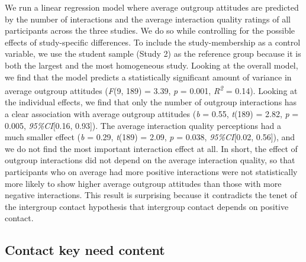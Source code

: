 We run a linear regression model where average outgroup attitudes are
predicted by the number of interactions and the average interaction
quality ratings of all participants across the three studies. We do so
while controlling for the possible effects of study-specific
differences. To include the study-membership as a control variable, we
use the student sample (Study 2) as the reference group because it is
both the largest and the most homogeneous study. Looking at the overall
model, we find that the model predicts a statistically significant
amount of variance in average outgroup attitudes (\textit{F}(9, 189) =
3.39, \textit{p} = 0.001, \textit{R\textsuperscript{2}} = 0.14). Looking
at the individual effects, we find that only the number of outgroup
interactions has a clear association with average outgroup attitudes
(\textit{b} = 0.55, \textit{t}(189) = 2.82, \textit{p} = 0.005,
\textit{95\%CI}{[}0.16, 0.93{]}). The average interaction quality
perceptions had a much smaller effect (\textit{b} = 0.29,
\textit{t}(189) = 2.09, \textit{p} = 0.038, \textit{95\%CI}{[}0.02,
0.56{]}), and we do not find the most important interaction effect at
all. In short, the effect of outgroup interactions did not depend on the
average interaction quality, so that participants who on average had
more positive interactions were not statistically more likely to show
higher average outgroup attitudes than those with more negative
interactions. This result is surprising because it contradicts the tenet
of the intergroup contact hypothesis that intergroup contact depends on
positive contact.

\subsection{Contact key need content}

